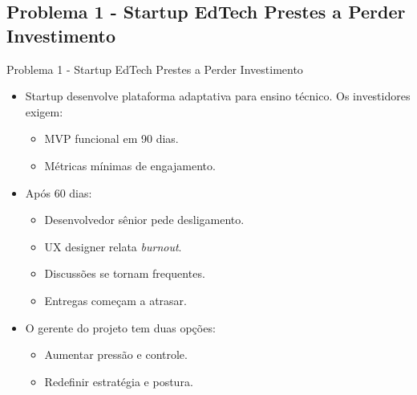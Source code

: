 \documentclass{beamer}
\begin{document}
\subsection{Problema 1 - Startup EdTech Prestes a Perder Investimento}

\begin{frame}{Problema 1 - Startup EdTech Prestes a Perder Investimento}
	\begin{itemize}
		\justifying
		\item Startup desenvolve plataforma adaptativa para ensino técnico. Os investidores exigem:
			\begin{itemize}
				\justifying
				\item MVP funcional em 90 dias.
				\item Métricas mínimas de engajamento.
			\end{itemize}
		\item Após 60 dias:
			\begin{itemize}
				\justifying
				\item Desenvolvedor sênior pede desligamento.
				\item UX designer relata \textit{burnout}.
				\item Discussões se tornam frequentes.
				\item Entregas começam a atrasar.
			\end{itemize}
		\item O gerente do projeto tem duas opções:
			\begin{itemize}
				\justifying
				\item Aumentar pressão e controle.
				\item Redefinir estratégia e postura.
			\end{itemize}
	\end{itemize}
\end{frame}
\end{document}
